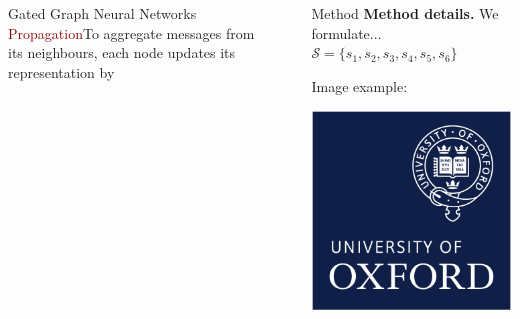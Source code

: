 \documentclass[final,hyperref={pdfpagelabels=false}]{beamer}
\newcommand{\shrink}{-15pt}
\begin{document}
\begin{frame}[t]
\begin{columns}[t]
\begin{column}{.3\textwidth}
\begin{block}{Gated Graph Neural Networks}
    \textcolor{darkred}{Propagation}\quad To aggregate messages from its neighbours, each node updates its representation by 
    
    
    
    \end{block}
    
    
    
    
  \end{column} %


  \begin{column}{.02\textwidth}\end{column} %

  \begin{column}{.3\textwidth} %
    \vspace{\shrink}
    \begin{block}{Method}
      \textbf{Method details.} We formulate... $\mathcal S = \{s_1, s_2, s_3, s_4, s_5, s_6 \}$

      Image example:
      \begin{center}
        \includegraphics[width=0.9\columnwidth]{ox_brand_cmyk_rev}
      \end{center}
    \end{block}

  \end{column} %


\end{columns}
\end{frame}
\end{document}
